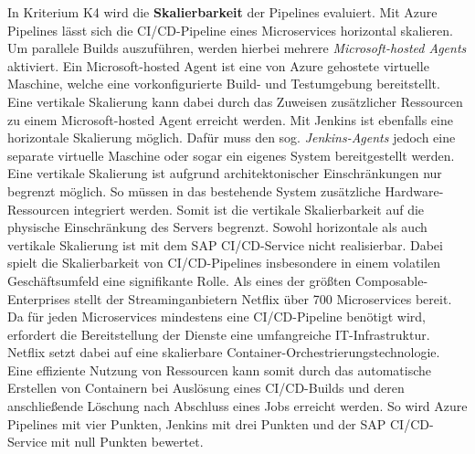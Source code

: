 In Kriterium K4 wird die \textbf{Skalierbarkeit} der Pipelines evaluiert. Mit Azure Pipelines lässt sich die CI/CD-Pipeline eines Microservices horizontal skalieren. Um parallele Builds auszuführen, werden hierbei mehrere \textit{Microsoft-hosted Agents} aktiviert. Ein Microsoft-hosted Agent ist eine von Azure gehostete virtuelle Maschine, welche eine vorkonfigurierte Build- und Testumgebung bereitstellt. Eine vertikale Skalierung kann dabei durch das Zuweisen zusätzlicher Ressourcen zu einem Microsoft-hosted Agent erreicht werden. Mit Jenkins ist ebenfalls eine horizontale Skalierung möglich. Dafür muss den sog. \textit{Jenkins-Agents} jedoch eine separate virtuelle Maschine oder sogar ein eigenes System bereitgestellt werden. Eine vertikale Skalierung ist aufgrund architektonischer Einschränkungen nur begrenzt möglich. So müssen in das bestehende System zusätzliche Hardware-Ressourcen integriert werden. Somit ist die vertikale Skalierbarkeit auf die physische Einschränkung des Servers begrenzt. Sowohl horizontale als auch vertikale Skalierung ist mit dem SAP CI/CD-Service nicht realisierbar. Dabei spielt die Skalierbarkeit von CI/CD-Pipelines insbesondere in einem volatilen Geschäftsumfeld eine signifikante Rolle. Als eines der größten Composable-Enterprises stellt der Streaminganbietern Netflix über 700 Microservices bereit. Da für jeden Microservices mindestens eine CI/CD-Pipeline benötigt wird, erfordert die  Bereitstellung der Dienste eine umfangreiche IT-Infrastruktur. Netflix setzt dabei auf eine skalierbare Container-Orchestrierungstechnologie. Eine effiziente Nutzung von Ressourcen kann somit durch das automatische Erstellen von Containern bei Auslösung eines CI/CD-Builds und deren anschließende Löschung nach Abschluss eines Jobs erreicht werden. So wird Azure Pipelines mit vier Punkten, Jenkins mit drei Punkten und der SAP CI/CD-Service mit null Punkten bewertet.\\ 

